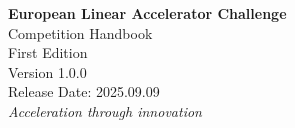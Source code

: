 
\begin{titlepage}
    \centering
    \vspace*{2cm}
    {\Huge\bfseries European Linear Accelerator Challenge\\[0.5cm]}
    {\LARGE Competition Handbook\\[2cm]}
    {\Large First Edition\\[2cm]}
    {\Large Version 1.0.0\\[0.5cm]}
    {\large Release Date: 2025.09.09\\[2cm]}
    \vfill
    {\large\textit{Acceleration through innovation}}\\[0.5cm]
    
\end{titlepage}
